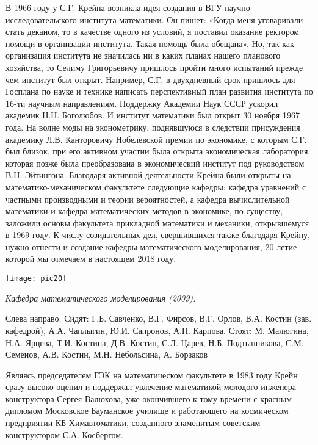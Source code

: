 В 1966 году у С.Г. Крейна возникла идея создания в ВГУ научно-исследовательского института математики. Он пишет: «Когда меня уговаривали стать деканом, то в качестве одного из условий, я поставил оказание ректором помощи в организации института. Такая помощь была обещана». Но, так как организация института не значилась ни в каких планах нашего планового хозяйства, то Селиму Григорьевичу пришлось пройти много испытаний прежде чем институт был открыт. Например, С.Г. в двухдневный срок пришлось для Госплана по науке и технике написать перспективный план развития института по 16-ти научным направлениям. Поддержку Академии Наук СССР ускорил академик Н.Н. Боголюбов. И институт математики был открыт 30      ноября 1967 года.
На волне моды на эконометрику, поднявшуюся в следствии присуждения академику Л.В. Канторовичу Нобелевской премии по экономике, с которым С.Г. был близок, при его активном участии была открыта экономическая лаборатория, которая позже была преобразована в экономический институт под руководством В.Н. Эйтингона. Благодаря активной деятельности Крейна были открыты на математико-механическом факультете следующие кафедры: кафедра уравнений с частными производными и теории вероятностей, а кафедра вычислительной математики и кафедра математических методов в экономике, по существу, заложили основы факультета прикладной математики и механики, открывшемуся в 1969 году.
К числу созидательных дел, свершившихся также благодаря Крейну, нужно отнести и создание кафедры математического моделирования, 20-летие которой мы отмечаем в настоящем 2018 году.


\begin{center}

\texttt{[image: pic20]}


{\it Кафедра математического моделирования (2009).

Слева направо. Сидят: Г.Б. Савченко, В.Г. Фирсов, В.Г. Орлов, В.А. Костин (зав. кафедрой), А.А. Чаплыгин, Ю.И. Сапронов, А.П. Карпова. Стоят: М. Малюгина, Н.А. Ярцева, Т.И. Костина, Д.В. Костин, С.Л. Царев, Н.Б. Подтынникова, С.М. Семенов, А.В. Костин, М.Н. Небольсина, А. Борзаков
}
\end{center}

Являясь председателем ГЭК на математическом факультете в 1983 году Крейн сразу высоко оценил и поддержал увлечение математикой молодого инженера-конструктора Сергея Валюхова, уже окончившего к тому времени с красным дипломом Московское Бауманское училище и работающего на космическом предприятии КБ Химавтоматики, созданного знаменитым советским конструктором С.А. Косбергом.


